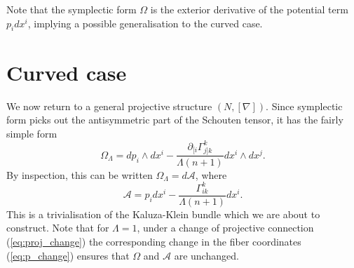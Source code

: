 Note that the symplectic form $\Omega$ is the exterior derivative
of the potential term $p_{i} dx^{i}$, implying a possible
generalisation to the curved case.


\section{Curved case}

We now return to a general projective structure $(N,[\nabla])$. Since
symplectic form picks out the antisymmetric part of the Schouten tensor,
it has the fairly simple form
\[
\Omega_{\Lambda}= dp_{i}\wedge dx^{i}-\frac{\partial_{[i}\Gamma_{j]k}^{k}}{\Lambda(n+1)} dx^{i}\wedge dx^{j}.
\]
By inspection, this can be written $\Omega_{\Lambda}=d\mathcal{A}$,
where
\[
\mathcal{A}=p_{i} dx^{i}-\frac{\Gamma_{ik}^{k}}{\Lambda(n+1)} dx^{i}.
\]
This is a trivialisation of the Kaluza-Klein bundle which we are about
to construct. Note that for $\Lambda=1$, under a change of projective
connection (\ref{eq:proj_change}) the corresponding change in the
fiber coordinates (\ref{eq:p_change}) ensures that $\Omega$ and
$\mathcal{A}$ are unchanged.

